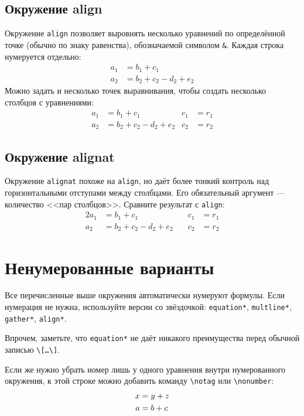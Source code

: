 \subsection{Окружение align}
\par Окружение \verb"align" позволяет выровнять несколько уравнений по определённой точке (обычно по знаку равенства), обозначаемой символом \verb"&". Каждая строка нумеруется отдельно:
\begin{align}
    a_1& =b_1+c_1\\
    a_2& =b_2+c_2-d_2+e_2
\end{align}
Можно задать и несколько точек выравнивания, чтобы создать несколько столбцов с уравнениями:
\begin{align}
    a_1& =b_1+c_1  & c_1 &= r_1\\
    a_2& =b_2+c_2-d_2+e_2  & c_2 &= r_2
\end{align}

\subsection{Окружение alignat}
\par Окружение \verb"alignat" похоже на \verb"align", но даёт более тонкий контроль над горизонтальными отступами между столбцами. Его обязательный аргумент --- количество <<пар столбцов>>. Сравните результат с \verb"align":
\begin{alignat}{2}
    a_1& =b_1+c_1  &\quad c_1 &= r_1\\
    a_2& =b_2+c_2-d_2+e_2  &\quad c_2 &= r_2
\end{alignat}

\section{Ненумерованные варианты}
\par Все перечисленные выше окружения автоматически нумеруют формулы. Если нумерация не нужна, используйте версии со звёздочкой: \verb"equation*", \verb"multline*", \verb"gather*", \verb"align*".
\par Впрочем, заметьте, что \verb"equation*" не даёт никакого преимущества перед обычной записью \verb"\[…\]".
\par Если же нужно убрать номер лишь у одного уравнения внутри нумерованного окружения, к этой строке можно добавить команду \verb"\notag" или \verb"\nonumber":
\begin{align}
    x &= y+z \notag\\
    a &= b+c
\end{align}

